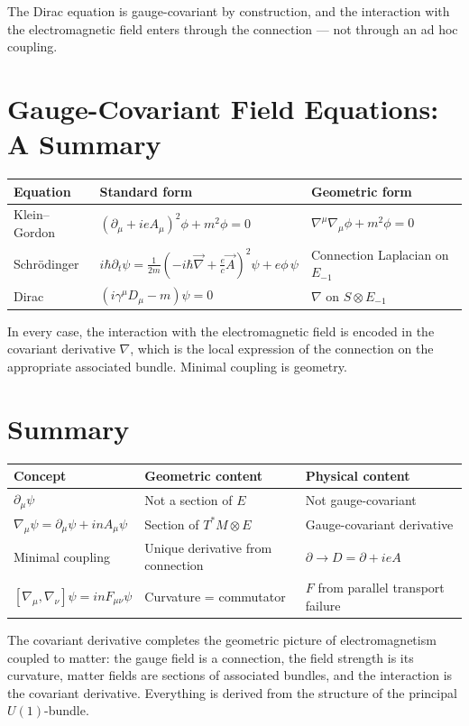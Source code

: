 The Dirac equation is gauge-covariant by construction, and the interaction with the electromagnetic field enters through the connection --- not through an ad hoc coupling.

\section{Gauge-Covariant Field Equations: A Summary}

\begin{table}[h]
\centering
\renewcommand{\arraystretch}{1.5}
\begin{tabular}{lll}
\toprule
\textbf{Equation} & \textbf{Standard form} & \textbf{Geometric form} \\
\midrule
Klein--Gordon & $(\partial_\mu + ieA_\mu)^2\phi + m^2\phi = 0$ & $\nabla^\mu\nabla_\mu\phi + m^2\phi = 0$ \\
Schr\"odinger & $i\hbar\partial_t\psi = \frac{1}{2m}(-i\hbar\vec{\nabla} + \frac{e}{c}\vec{A})^2\psi + e\phi\,\psi$ & Connection Laplacian on $E_{-1}$ \\
Dirac & $(i\gamma^\mu D_\mu - m)\psi = 0$ & $\nabla$ on $S \otimes E_{-1}$ \\
\bottomrule
\end{tabular}
\end{table}

In every case, the interaction with the electromagnetic field is encoded in the covariant derivative $\nabla$, which is the local expression of the connection on the appropriate associated bundle. Minimal coupling is geometry.

\section{Summary}

\begin{table}[h]
\centering
\renewcommand{\arraystretch}{1.4}
\begin{tabular}{lll}
\toprule
\textbf{Concept} & \textbf{Geometric content} & \textbf{Physical content} \\
\midrule
$\partial_\mu\psi$ & Not a section of $E$ & Not gauge-covariant \\
$\nabla_\mu\psi = \partial_\mu\psi + inA_\mu\psi$ & Section of $T^*M \otimes E$ & Gauge-covariant derivative \\
Minimal coupling & Unique derivative from connection & $\partial \to D = \partial + ieA$ \\
$[\nabla_\mu,\nabla_\nu]\psi = inF_{\mu\nu}\psi$ & Curvature = commutator & $F$ from parallel transport failure \\
\bottomrule
\end{tabular}
\end{table}

The covariant derivative completes the geometric picture of electromagnetism coupled to matter: the gauge field is a connection, the field strength is its curvature, matter fields are sections of associated bundles, and the interaction is the covariant derivative. Everything is derived from the structure of the principal $U(1)$-bundle.
